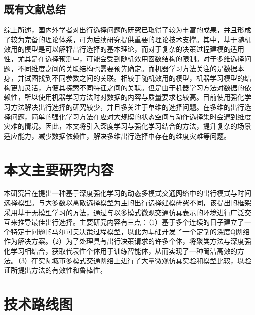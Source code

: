 \subsection{既有文献总结}

综上所述，国内外学者对出行选择问题的研究已取得了较为丰富的成果，并且形成了较为完备的理论体系，可为后续研究提供重要的理论技术支撑。其中，基于随机效用的模型是可以解释出行选择的基本理论，而对于复杂的决策过程建模的适用性，尤其是在选择预测中，可能会受到随机效用函数结构的限制。对于多维选择问题，不同维度之间的关联结构也需要预先确定。而机器学习方法关注的是数据本身，并试图找到不同参数之间的关联。相较于随机效用的模型，机器学习模型的结构更加灵活，方便其探索不同特征之间的关联。但是由于机器学习方法对数据的依赖性，所以使用机器学习方法时对数据的内容与质量要求也较高。目前使用强化学习方法解决出行选择的研究较少，并且多关注于单维的选择问题。在多维的出行选择问题，简单的强化学习方法在应对大规模的状态空间与动作选择集时会遇到维度灾难的情况。因此，本文将引入深度学习与强化学习结合的方法，提升复杂的场景适应能力，减少数据依赖性，解决多维出行选择中存在的维度灾难等问题。

\section{本文主要研究内容}

本研究旨在提出一种基于深度强化学习的动态多模式交通网络中的出行模式与时间选择模型。与大多数以离散选择模型为主的出行选择建模研究不同，该提出的框架采用基于无模型学习的方法，通过与以多模式微观交通仿真表示的环境进行广泛交互来推导最佳出行选择。主要研究内容有三点：（1）基于多个连续的日子建立了一个特定于问题的马尔可夫决策过程模型，以此为基础开发了一个定制的深度Q网络作为解决方案。（2）为了处理具有出行决策请求的许多个体，将聚类方法与深度强化学习相结合，获取代表性个体用于训练智能体，从而实现了一种简洁高效的方法。（3）在实际城市多模式交通网络上进行了大量微观仿真实验和模型比较，以验证所提出方法的有效性和鲁棒性。

\section{技术路线图}

